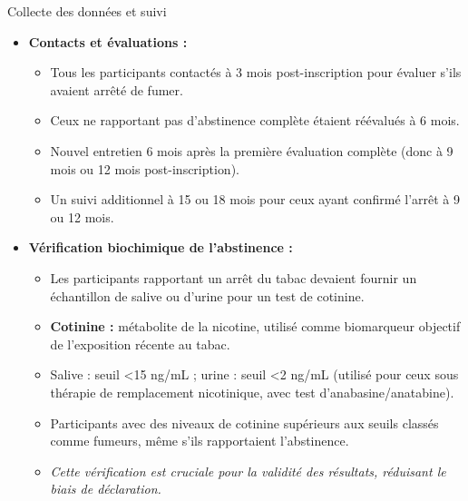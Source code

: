 \documentclass[aspectratio=169,xcolor=dvipsnames]{beamer}
\begin{document}
\begin{frame}{Collecte des données et suivi}
    \begin{itemize}
        \item \textbf{Contacts et évaluations :}
            \begin{itemize}
                \item Tous les participants contactés à 3 mois post-inscription pour évaluer s'ils avaient arrêté de fumer.
                \item Ceux ne rapportant pas d'abstinence complète étaient réévalués à 6 mois.
                \item Nouvel entretien 6 mois après la première évaluation complète (donc à 9 mois ou 12 mois post-inscription).
                \item Un suivi additionnel à 15 ou 18 mois pour ceux ayant confirmé l'arrêt à 9 ou 12 mois.
            \end{itemize}
        \item \textbf{Vérification biochimique de l'abstinence :}
            \begin{itemize}
                \item Les participants rapportant un arrêt du tabac devaient fournir un échantillon de salive ou d'urine pour un test de cotinine.
                \item \textbf{Cotinine :} métabolite de la nicotine, utilisé comme biomarqueur objectif de l'exposition récente au tabac.
                \item Salive : seuil <15 ng/mL ; urine : seuil <2 ng/mL (utilisé pour ceux sous thérapie de remplacement nicotinique, avec test d'anabasine/anatabine).
                \item Participants avec des niveaux de cotinine supérieurs aux seuils classés comme fumeurs, même s'ils rapportaient l'abstinence.
                \item \textit{Cette vérification est cruciale pour la validité des résultats, réduisant le biais de déclaration.}
            \end{itemize}
    \end{itemize}
\end{frame}
\end{document}
